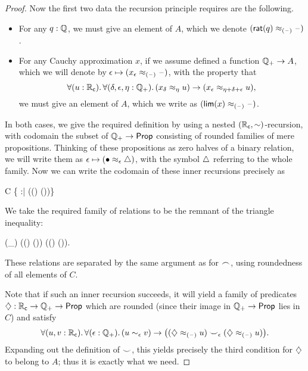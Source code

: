 \begin{proof}
  Now the first two data the recursion principle requires are the following.
  \begin{itemize}
  \item For any $q:\mathbb{Q}$, we must give an element of $A$, which we denote $(\mathsf{rat}(q)\approx_{(\mathord{\hspace{1pt}\text{--}\hspace{1pt}})} \mathord{\hspace{1pt}\text{--}\hspace{1pt}})$.
  \item For any Cauchy approximation $x$, if we assume defined a function $\mathbb{Q}_{+} \to A$, which we will denote by $\epsilon \mapsto (x_\epsilon \approx_{(\mathord{\hspace{1pt}\text{--}\hspace{1pt}})} \mathord{\hspace{1pt}\text{--}\hspace{1pt}})$, with the property that 
    \begin{equation}
      \fall{u:\RC}{\delta,\epsilon,\eta:\Qp} (x_\delta \approx_\eta u) \to (x_\epsilon \approx_{\eta+\delta+\epsilon} u),\label{eq:appxrec2}
    \end{equation}
    we must give an element of $A$, which we write as $(\mathsf{lim}(x)\approx_{(\mathord{\hspace{1pt}\text{--}\hspace{1pt}})} \mathord{\hspace{1pt}\text{--}\hspace{1pt}})$.
  \end{itemize}
  In both cases, we give the required definition by using a nested $(\mathbb{R}_\mathsf{c},\mathord\sim)$-recursion, with codomain the subset of $\mathbb{Q}_{+}\to\mathsf{Prop}$ consisting of rounded families of mere propositions.
  Thinking of these propositions as zero halves of a binary relation, we will write them as $\epsilon \mapsto (\bullet\approx_{\epsilon}\triangle)$, with the symbol $\triangle$ referring to the whole family.
  Now we can write the codomain of these inner recursions precisely as
  \begin{narrowmultline*}
    C 
    \bigg\{ \tapname :\Qp\to\prop \;\;\Big|\;\; \narrowbreak
    \fall{\epsilon:\Qp} \Big((\tap\epsilon) \Leftrightarrow \exis{\theta:\Qp} (\tap{\epsilon-\theta})\Big)\bigg\}
  \end{narrowmultline*}
  We take the required family of relations to be the remnant of the triangle inequality:
  \begin{narrowmultline*}
    (\tapname \bbsim_\epsilon \tapbname) 
    \fall{\eta:\Qp} ((\tap\eta) \to (\tapb{\epsilon+\eta})) \land
    \narrowbreak
    ((\tapb\eta) \to (\tap{\epsilon+\eta})).
  \end{narrowmultline*}
  These relations are separated by the same argument as for $\frown$, using roundedness of all elements of $C$.

  Note that if such an inner recursion succeeds, it will yield a family of predicates $\diamondsuit : \mathbb{R}_\mathsf{c}\to\mathbb{Q}_{+}\to \mathsf{Prop}$ which are rounded
(since their image in $\mathbb{Q}_{+}\to\mathsf{Prop}$ lies in $C$) and satisfy
  \[ \fall{u,v:\RC}{\epsilon:\Qp} (u\close\epsilon v) \to \big((\hapx_{(\blank)} u) \bbsim_\epsilon (\hapx_{(\blank)} u)\big). \]
  Expanding out the definition of $\smile$, this yields precisely the third condition for $\diamondsuit$ to belong to $A$; thus it is exactly what we need.


\end{proof}
